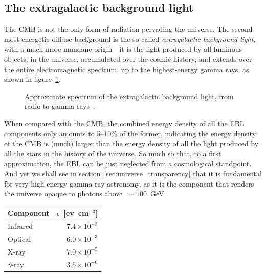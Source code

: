 \subsection{The extragalactic background light}

The CMB is not the only form of radiation pervading the universe. The second most
energetic diffuse background is the so-called \emph{extragalactic background light},
with a much more mundane origin---it is the light produced by all luminous objects,
in the universe, accumulated over the cosmic history, and extends over the entire
electromagnetic spectrum, up to the highest-energy gamma rays, as shown in
figure~\ref{fig:ebl}.

\begin{figure}[!htbp]
  
  \caption{Approximate spectrum of the extragalactic background light, from
		radio to gamma rays~\cite{}.}
  \label{fig:ebl}
\end{figure}

When compared with the CMB, the combined energy density of all the EBL components
only amounts to 5--10\% of the former, indicating the energy density of the CMB
is (much) larger than the energy density of all the light produced by all the stars
in the history of the universe. So much so that, to a first approximation, the
EBL can be just neglected from a cosmological standpoint. And yet we shall see in
section~\ref{sec:universe_transparency} that it is fundamental for very-high-energy
gamma-ray astronomy, as it is the component that renders the universe opaque to
photons above $~\sim 100$~GeV.

\begin{margintable}
	\begin{tabular}{lr}
		\hline
		Component & $\epsilon$~[ev~cm$^{-3}$]\\
		\hline
		\hline
		Infrared & $7.4 \times 10^{-3}$\\
		Optical & $ 6.0 \times 10^{-3}$\\
		X-ray & $ 7.0 \times 10^{-5}$\\
		$\gamma$-ray & $ 3.5 \times 10^{-6}$\\
		\hline
	\end{tabular}
	\caption{Energy density of the various components of the extragalactic background light.}
\end{margintable}


%
%
%
%
